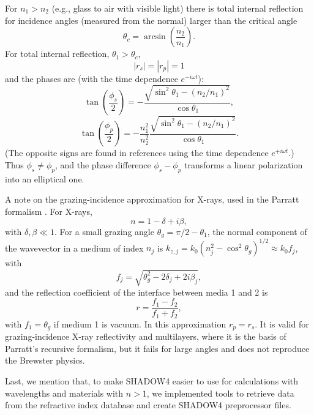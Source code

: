 \documentclass{iucr}
\begin{document}
For $n_1 > n_2$ (e.g., glass to air with visible light) there is total internal reflection for incidence angles (measured from the normal) larger than the critical angle
\begin{equation}
\theta_c = \arcsin\left(\frac{n_2}{n_1}\right).
\end{equation}
For total internal reflection, $\theta_1 > \theta_c$,
\begin{equation}
|r_s| = |r_p| = 1
\end{equation}
and the phases are (with the time dependence $e^{-i\omega t}$):
\begin{equation}\label{eq:mirrorphases}
\tan\left(\frac{\phi_s}{2}\right)
=
-\frac{\sqrt{\sin^2\theta_1 - (n_2/n_1)^2}}
     {\cos\theta_1},
\end{equation}
\begin{equation}\label{eq:mirrorphasep}
\tan\left(\frac{\phi_p}{2}\right)
=
-\frac{n_1^2}{n_2^2}
\frac{\sqrt{\sin^2\theta_1 - (n_2/n_1)^2}}
     {\cos\theta_1}.
\end{equation}
(The opposite signs are found in references using the time dependence $e^{+i\omega t}$.)
Thus $\phi_s \neq \phi_p$, and the phase difference $\phi_s-\phi_p$ transforms a linear polarization into an elliptical one.

A note on the grazing-incidence approximation for X-rays, used in the Parratt formalism \cite{parratt}. For X-rays,
\begin{equation}
n = 1 - \delta + i\beta,
\end{equation}
with $\delta,\beta \ll 1$. For a small grazing angle $\theta_g=\pi/2-\theta_1$, the normal component of the wavevector in a medium of index $n_j$ is $k_{z,j}=k_0 (n_j^2-\cos^2\theta_g)^{1/2}\approx k_0 f_j$, with
\begin{equation}
f_j = \sqrt{\theta_g^2 - 2\delta_j + 2i\beta_j},
\end{equation}
and the reflection coefficient of the interface between media 1 and 2 is
\begin{equation}
r = \frac{f_1 - f_2}{f_1 + f_2},
\end{equation}
with $f_1=\theta_g$ if medium 1 is vacuum. In this approximation $r_p=r_s$. It is valid for grazing-incidence X-ray reflectivity and multilayers, where it is the basis of Parratt's recursive formalism, but it fails for large angles and does not reproduce the Brewster physics.

Last, we mention that, to make SHADOW4 easier to use for calculations with wavelengths and materials with $n>1$, we implemented tools to retrieve data from the refractive index database \cite{RefractiveIndexDatabase2024} and create SHADOW4 preprocessor files. 
\end{document}
